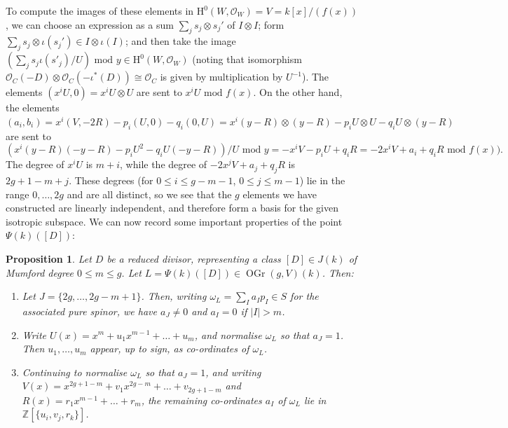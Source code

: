 \documentclass{article} %
\newtheorem{proposition}{Proposition}[section]
\numberwithin{equation}{section}
\renewcommand{\O}{\mathcal{O}}
\newcommand{\HH}{\mathrm{H}}
\newcommand{\cO}{\mathcal{O}}
\newcommand{\Z}{\mathbb{Z}}
\DeclareMathOperator{\OGr}{OGr}
\begin{document}
To compute the images of these elements in $\HH^0(W, \cO_W) = V = k[x] / (f(x))$, we can choose an expression as a sum $\sum_j s_j \otimes s_j'$ of $I \otimes I$; form $\sum_j s_j \otimes \iota(s_j') \in I \otimes \iota(I)$; and then take the image $(\sum_j s_j \iota(s'_j) / U) \text{ mod } y \in \HH^0(W, \cO_W)$ (noting that isomorphism $\O_C(-D) \otimes \O_C(-\iota^\ast(D)) \cong \O_C$ is given by multiplication by $U^{-1}$). The elements $(x^i U, 0) = x^i U \otimes U$ are sent to $x^i U \text{ mod } f(x)$. On the other hand, the elements $(a_i, b_i) = x^i (V, -2 R) - p_i (U, 0) - q_i (0, U) = x^i (y-R) \otimes (y-R) - p_i U \otimes U - q_i U \otimes (y-R)$ are sent to
\[ ( x^i (y-R)(-y-R) - p_i U^2 - q_i U (-y-R) ) / U \text{ mod } y = -x^i V - p_i U + q_i R = -2 x^i V + a_i + q_i R \text{ mod }f(x)). \]
The degree of $x^i U$ is $m +i$, while the degree of $-2 x^j V + a_j + q_j R$ is $2g+1-m+j$. These degrees (for $0 \leq i \leq g-m-1$, $0 \leq j \leq m-1$) lie in the range $0, \dots, 2g$ and are all distinct, so we see that the $g$ elements we have constructed are linearly independent, and therefore form a basis for the given isotropic subspace. We can now record some important properties of the point $\Psi(k)([D])$:
\begin{proposition}\label{prop_properties_of_explicit_Kummer_morphism}
    Let $D$ be a reduced divisor, representing a class $[D] \in J(k)$ of Mumford degree $0 \leq m \leq g$. Let $L = \Psi(k)([D]) \in \OGr(g, V)(k)$. Then:
    \begin{enumerate}
        \item Let $J = \{ 2g, \dots, 2g-m+1 \}$. Then, writing $\omega_L = \sum_I a_I p_I \in S$ for the associated pure spinor, we have $a_J \neq 0$ and $a_I = 0$ if $|I| > m$.
        \item Write $U(x) = x^m + u_{1} x^{m-1} + \dots + u_m$, and normalise $\omega_L$ so that $a_J = 1$. Then $u_{1}, \dots, u_m$ appear, up to sign, as co-ordinates of $\omega_L$.
        \item Continuing to normalise $\omega_L$ so that $a_J = 1$, and writing $V(x) = x^{2g+1-m} + v_1 x^{2g-m} + \dots + v_{2g+1-m}$ and $R(x) = r_1 x^{m-1} + \dots + r_m$, the remaining co-ordinates $a_I$ of $\omega_L$ lie in $\Z[ \{ u_i, v_j, r_k \} ]$.
    \end{enumerate}
\end{proposition}
\end{document}
